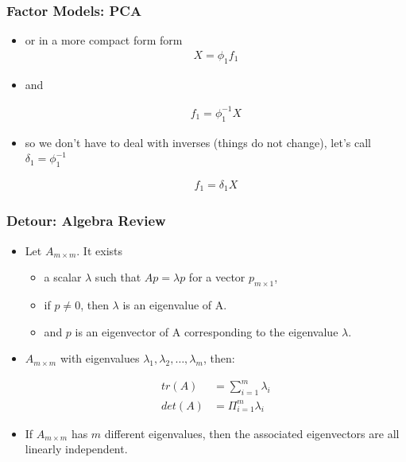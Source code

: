 \documentclass[
  shownotes,
  xcolor={svgnames},
  hyperref={colorlinks,citecolor=DarkBlue,linkcolor=DarkRed,urlcolor=DarkBlue}
  , aspectratio=169]{beamer}
\begin{document}
\begin{frame}
\frametitle{Factor Models: PCA}

\begin{itemize}

\item or in a more compact form form
\begin{align}
X = \phi_1 f_1
\end{align}

\item and

\begin{align}
f_1 = \phi_1^{-1}X
\end{align}

\item so we don't have to deal with inverses (things do not change), let's call $\delta_1=\phi_1^{-1}$

\begin{align}
f_1 = \delta_1 X
\end{align}
\end{itemize}


\end{frame}
\begin{frame}
\frametitle{Detour: Algebra Review}

\begin{itemize}

\item Let $A_{m\times m}$. It exists 
\begin{itemize}
  \item a scalar $\lambda$ such that $Ap = \lambda p$ for a vector $p_{m\times 1}$, 
  \item if $p \neq 0$, then $\lambda$ is an eigenvalue of A. 
  \item and $p$ is an eigenvector of A corresponding to the eigenvalue $\lambda$.
\end{itemize}

\item $A_{m\times m}$ with eigenvalues $\lambda_1, \lambda_2,\dots,\lambda_m$, then:

\begin{align}
tr(A) &= \sum_{i=1}^m \lambda_i \\
det(A) &= \Pi_{i=1}^m \lambda_i
\end{align}

\item If $A_{m\times m}$ has $m$ different eigenvalues, then the associated eigenvectors are all linearly independent.
\end{itemize}
\end{frame}
\end{document}
